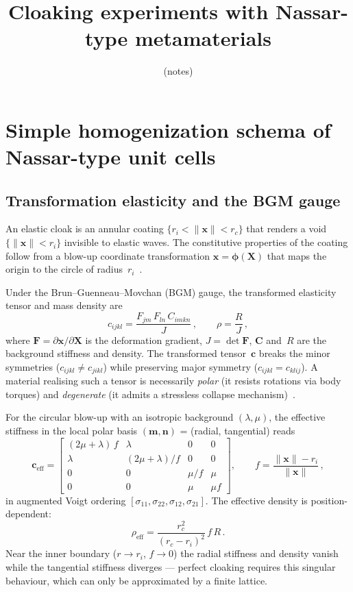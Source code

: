 \documentclass{article}
\title{Cloaking experiments with Nassar-type metamaterials\vspace{-1em}}
\author{(notes)}
\date{}
\newcommand{\mbf}[1]{\mathbf{#1}}
\newcommand{\be}{\begin{equation}}
\newcommand{\ee}{\end{equation}}
\begin{document}
\maketitle
\tableofcontents

\section{Simple homogenization schema of Nassar-type unit cells}

\subsection{Transformation elasticity and the BGM gauge}

An elastic cloak is an annular coating $\{r_i < \|\mbf{x}\| < r_c\}$ that
renders a void $\{\|\mbf{x}\| < r_i\}$ invisible to elastic waves.
The constitutive properties of the coating follow from a
blow-up coordinate transformation $\mbf{x} = \boldsymbol{\phi}(\mbf{X})$
that maps the origin to the circle of radius~$r_i$~\cite{brun2009}.

Under the Brun--Guenneau--Movchan (BGM) gauge, the transformed
elasticity tensor and mass density are~\cite{nassar2018}
\be\label{eq:pushforward}
  c_{ijkl}
  = \frac{F_{jm}\,F_{ln}\,C_{imkn}}{J}\,,
  \qquad
  \rho = \frac{R}{J}\,,
\ee
where $\mbf{F} = \partial\mbf{x}/\partial\mbf{X}$ is the deformation
gradient, $J = \det\mbf{F}$, $\mbf{C}$ and~$R$ are the background
stiffness and density.
The transformed tensor~$\mbf{c}$ breaks the minor symmetries
($c_{ijkl} \neq c_{jikl}$) while preserving major symmetry
($c_{ijkl} = c_{klij}$).
A material realising such a tensor is necessarily \emph{polar}
(it resists rotations via body torques) and \emph{degenerate}
(it admits a stressless collapse mechanism)~\cite{nassar2018}.

For the circular blow-up with an isotropic background
$(\lambda,\mu)$, the effective stiffness in the local polar
basis $(\mbf{m}, \mbf{n})$ = (radial, tangential) reads
\be\label{eq:Ceff}
  \mbf{c}_{\mathrm{eff}}
  =
  \begin{bmatrix}
    (2\mu{+}\lambda)\,f & \lambda & 0 & 0 \\
    \lambda & (2\mu{+}\lambda)/f & 0 & 0 \\
    0 & 0 & \mu/f & \mu \\
    0 & 0 & \mu & \mu f
  \end{bmatrix},
  \qquad
  f = \frac{\|\mbf{x}\| - r_i}{\|\mbf{x}\|}\,,
\ee
in augmented Voigt ordering
$[\sigma_{11},\sigma_{22},\sigma_{12},\sigma_{21}]$.
The effective density is position-dependent:
\be\label{eq:rhoeff}
  \rho_{\mathrm{eff}}
  = \frac{r_c^2}{(r_c - r_i)^2}\,f\,R\,.
\ee
Near the inner boundary ($r\to r_i$, $f\to 0$) the radial stiffness
and density vanish while the tangential stiffness diverges ---
perfect cloaking requires this singular behaviour, which can only be
approximated by a finite lattice.
\end{document}
